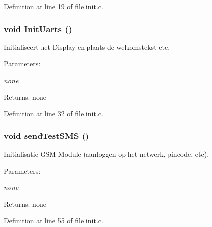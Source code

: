 Definition at line 19 of file init.c.
\subsubsection{\setlength{\rightskip}{0pt plus 5cm}void InitUarts ()}\label{init_8c_7b2d590b69c4a0a9fc52ccf2d5d94c10}


Initialiseert het Display en plaats de welkomstekst etc. 

\begin{Desc}
\item[Parameters:]
\begin{description}
\item[{\em none}]\end{description}
\end{Desc}
\begin{Desc}
\item[Returns:]none \end{Desc}


Definition at line 32 of file init.c.
\subsubsection{\setlength{\rightskip}{0pt plus 5cm}void sendTestSMS ()}\label{init_8c_ebfcbbbbc20b31b0e209dd6e122eaf51}


Initialisatie GSM-Module (aanloggen op het netwerk, pincode, etc). 

\begin{Desc}
\item[Parameters:]
\begin{description}
\item[{\em none}]\end{description}
\end{Desc}
\begin{Desc}
\item[Returns:]none \end{Desc}


Definition at line 55 of file init.c.